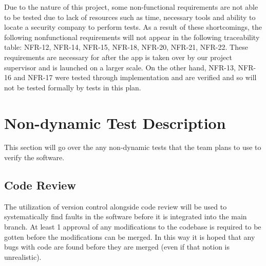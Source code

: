 \documentclass[12pt, titlepage]{article}
\begin{document}
Due to the nature of this project, some non-functional requirements are not able to be tested due to lack of resources such as time, necessary tools and ability to locate a security company to perform tests. As a result of these shortcomings, the following nonfunctional requirements will not appear in the following traceability table: NFR-12, NFR-14, NFR-15, NFR-18, NFR-20, NFR-21, NFR-22. These requirements are necessary for after the app is taken over by our project supervisor and is launched on a larger scale. On the other hand, NFR-13, NFR-16 and NFR-17 were tested through implementation and are verified and so will not be tested formally by tests in this plan.
\begin{table}[H]
  \centering
  \caption{Traceability Table for Non-Functional Test Cases and Requirements}
  \label{tab:NFRTrace}
\end{table}

\section{Non-dynamic Test Description}

This section will go over the any non-dynamic tests that the team plans to use to verify the software.

\subsection{Code Review}

The utilization of version control alongside code review will be used to systematically find faults in the software before it is integrated into the main branch. At least 1 approval of any modifications to the codebase is required to be gotten before the modifications can be merged. In this way it is hoped that any bugs with code are found before they are merged (even if that notion is unrealistic).
\end{document}
